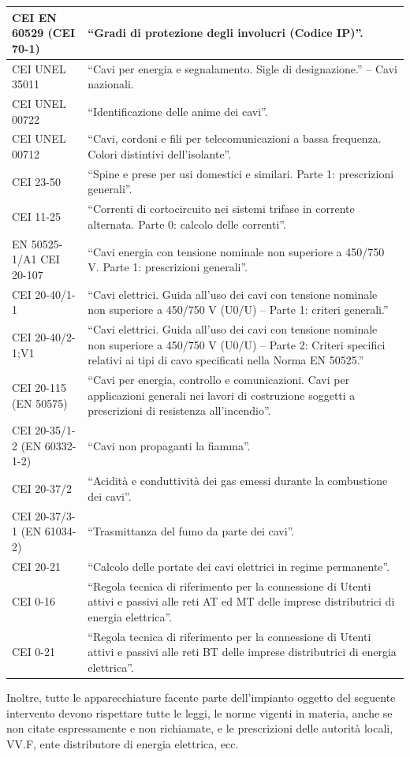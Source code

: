 \begin{longtable}{|p{4cm}|p{10cm}|}
\hline
CEI EN 60529 (CEI 70-1) & ``Gradi di protezione degli involucri (Codice IP)''. \\
\hline
CEI UNEL 35011 & ``Cavi per energia e segnalamento. Sigle di designazione.'' -- Cavi nazionali. \\
\hline
CEI UNEL 00722 & ``Identificazione delle anime dei cavi''. \\
\hline
CEI UNEL 00712 & ``Cavi, cordoni e fili per telecomunicazioni a bassa frequenza. Colori distintivi dell'isolante''. \\
\hline
CEI 23-50 & ``Spine e prese per usi domestici e similari. Parte 1: prescrizioni generali''. \\
\hline
CEI 11-25 & ``Correnti di cortocircuito nei sistemi trifase in corrente alternata. Parte 0: calcolo delle correnti''. \\
\hline
EN 50525-1/A1 CEI 20-107 & ``Cavi energia con tensione nominale non superiore a 450/750 V. Parte 1: prescrizioni generali''. \\
\hline
CEI 20-40/1-1 & ``Cavi elettrici. Guida all'uso dei cavi con tensione nominale non superiore a 450/750 V (U0/U) -- Parte 1: criteri generali.'' \\
\hline
CEI 20-40/2-1;V1 & ``Cavi elettrici. Guida all'uso dei cavi con tensione nominale non superiore a 450/750 V (U0/U) -- Parte 2: Criteri specifici relativi ai tipi di cavo specificati nella Norma EN 50525.'' \\
\hline
CEI 20-115 (EN 50575) & ``Cavi per energia, controllo e comunicazioni. Cavi per applicazioni generali nei lavori di costruzione soggetti a prescrizioni di resistenza all'incendio''. \\
\hline
CEI 20-35/1-2 (EN 60332-1-2) & ``Cavi non propaganti la fiamma''. \\
\hline
CEI 20-37/2 & ``Acidità e conduttività dei gas emessi durante la combustione dei cavi''. \\
\hline
CEI 20-37/3-1 (EN 61034-2) & ``Trasmittanza del fumo da parte dei cavi''. \\
\hline
CEI 20-21 & ``Calcolo delle portate dei cavi elettrici in regime permanente''. \\
\hline
CEI 0-16 & ``Regola tecnica di riferimento per la connessione di Utenti attivi e passivi alle reti AT ed MT delle imprese distributrici di energia elettrica''. \\
\hline
CEI 0-21 & ``Regola tecnica di riferimento per la connessione di Utenti attivi e passivi alle reti BT delle imprese distributrici di energia elettrica''. \\
\hline
\end{longtable}

Inoltre, tutte le apparecchiature facente parte dell’impianto oggetto del seguente intervento devono rispettare tutte le leggi, le norme vigenti in materia, anche se non citate espressamente e non richiamate, e le prescrizioni delle autorità locali, VV.F, ente distributore di energia elettrica, ecc.